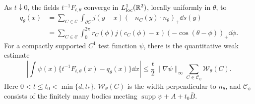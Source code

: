 \begin{lemma}
\label{lem:single-boundary-flux}
As $t\downarrow0$, the fields $t^{-1}F_{t,\theta}$ converge in
$L^1_{\mathrm{loc}}(\mathbb R^2)$, locally uniformly in $\theta$, to
\begin{align}
 q_\theta(x)
 &=\sum_{C\in\mathcal C}\int_{\partial C}
       j(y-x)(-n_C(y)\cdot n_\theta)_+\dd s(y)
       \label{eq:single-flux-boundary}\\
 &=\sum_{C\in\mathcal C}\int_0^{2\pi}
       r_C(\phi)j(c_C(\phi)-x)
                 (-\cos(\theta-\phi))_+\dd\phi.
       \label{eq:single-flux-gauss}
\end{align}
For a compactly supported $C^1$ test function $\psi$, there is the
quantitative weak estimate
\begin{equation}\label{eq:single-weak-flight-error}
 \left|\int\psi(x)\{t^{-1}F_{t,\theta}(x)-q_\theta(x)\}\dd x\right|
 \le\frac t2\|\nabla\psi\|_\infty
       \sum_{C\in\mathcal C_\psi}\mathcal W_\theta(C).
\end{equation}
Here $0<t\le t_0<\min\{d,t_*\}$,
$\mathcal W_\theta(C)$ is the width perpendicular to $n_\theta$,
and $\mathcal C_\psi$ consists of the finitely many bodies meeting
$\operatorname{supp}\psi+A+t_0\overline B$.
\end{lemma}
